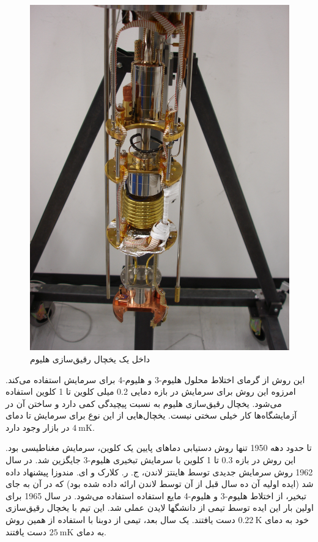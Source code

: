\documentclass[12pt,a4paper]{article}
\begin{document}
	\begin{figure}
	\centering
	\includegraphics[width=\linewidth]{hdc}
	\caption{داخل یک یخچال رقیق‌سازی هلیوم }
	\label{fig2}
	\end{figure}
	این روش از گرمای اختلاط محلول هلیوم-3 و هلیوم-4 برای سرمایش استفاده می‌کند.
	امرزوه این روش برای سرمایش در بازه دمایی 0.2 میلی کلوین تا 1 کلوین استفاده می‌شود.
	یخچال رقیق‌سازی هلیوم به نسبت پیچیدگی کمی دارد و ساختن آن در آزمایشگاه‌ها کار خیلی سختی نیست.
	یخچال‌هایی از این نوع برای سرمایش تا دمای $\SI{4}{\milli\kelvin}$ در بازار وجود دارد.
	
	تا حدود دهه 1950 تنها روش دستیابی دماهای پایین یک کلوین، سرمایش مغناطیسی بود. این روش در بازه 0.3 تا 1 کلوین با سرمایش تبخیری هلیوم-3 جایگزین شد.
	در سال 1962 روش سرمایش جدیدی توسط هاینتز لاندن، ج. ر. کلارک و ای. مندوزا
	پیشنهاد داده شد (ایده اولیه آن ده سال قبل از آن توسط لاندن ارائه داده شده بود) که در آن به جای تبخیر، از اختلاط هلیوم-3 و هلیوم-4 مایع استفاده استفاده می‌شود.
	در سال 1965 برای اولین بار این ایده توسط تیمی از دانشگها لایدن عملی شد.
	این تیم با یخچال رقیق‌سازی خود به دمای $\SI{0.22}{\kelvin}$ دست یافتند. یک سال بعد، تیمی از دوبنا
	با استفاده از همین روش به دمای $\SI{25}{\milli\kelvin}$ دست یافتند.
\end{document}
